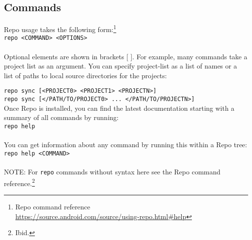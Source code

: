 \documentclass[12pt,letterpaper,dvips]{article}
\newcommand{\cmd}[1]{\texttt{#1}}
\begin{document}
\newpage
\subsection{Commands}
Repo usage takes the following form:\footnote{Repo command reference\\
\href{https://source.android.com/source/using-repo.html\#help}{https://source.android.com/source/using-repo.html\#help}}
\\
\indent \cmd{repo <COMMAND> <OPTIONS>}
\\
\\
Optional elements are shown in brackets [ ].  For example, many commands take
a project list as an argument.  You can specify project-list as a list of
names or a list of paths to local source directories for the projects:

\indent \cmd{repo sync [<PROJECT0> <PROJECT1> <PROJECTN>]}\\
\indent \cmd{repo sync [</PATH/TO/PROJECT0> ... </PATH/TO/PROJECTN>]}
\\

\noindent Once Repo is installed, you can find the latest documentation
starting with a summary of all commands by running:
\\
\indent \cmd{repo help}
\\
\\
\noindent You can get information about any command by running this within a Repo tree:
\\
\indent \cmd{repo help <COMMAND>}
\\
\\
NOTE: For \cmd{repo} commands without syntax here see the 
Repo command reference.\footnote{Ibid.}
\end{document}
